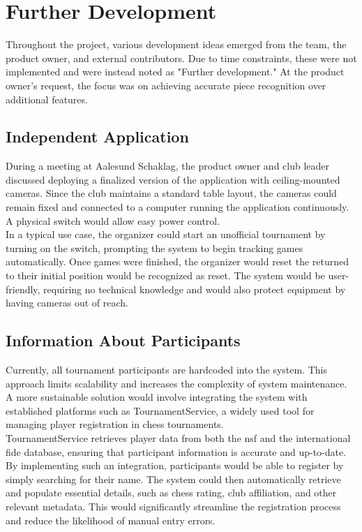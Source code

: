 

\section{Further Development}
Throughout the project, various development ideas emerged from the team, the product owner, and external contributors. Due to time constraints, these were not implemented and were instead noted as "Further development." At the product owner's request, the focus was on achieving accurate piece recognition over additional features.

\subsection{Independent Application}
During a meeting at Aalesund Schaklag, the product owner and club leader discussed deploying a finalized version of the application with ceiling-mounted cameras. Since the club maintains a standard table layout, the cameras could remain fixed and connected to a computer running the application continuously. A physical switch would allow easy power control. \\

In a typical use case, the organizer could start an unofficial tournament by turning on the switch, prompting the system to begin tracking games automatically. Once games were finished, the organizer would reset the returned to their initial position would be recognized as reset. The system would be user-friendly, requiring no technical knowledge and would also protect equipment by having cameras out of reach.

\subsection{Information About Participants}
Currently, all tournament participants are hardcoded into the system. This approach limits scalability and increases the complexity of system maintenance. A more sustainable solution would involve integrating the system with established platforms such as TournamentService, a widely used tool for managing player registration in chess tournaments. \\

TournamentService retrieves player data from both the \gls{nsf} and the international \gls{fide} database, ensuring that participant information is accurate and up-to-date. By implementing such an integration, participants would be able to register by simply searching for their name. The system could then automatically retrieve and populate essential details, such as chess rating, club affiliation, and other relevant metadata. This would significantly streamline the registration process and reduce the likelihood of manual entry errors. \\

